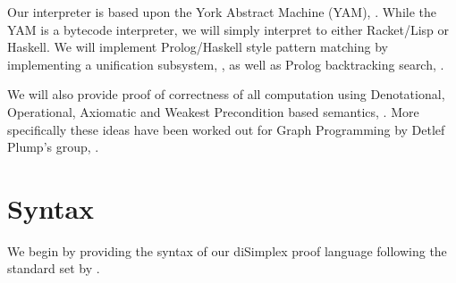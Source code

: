 Our interpreter is based upon the York Abstract Machine (YAM),
\cite{manningPlump2008yorkMachine}. While the YAM is a bytecode interpreter, we
will simply interpret to either Racket/Lisp or Haskell. We will implement
Prolog/Haskell style pattern matching by implementing a unification subsystem,
\cite[section
30.5.1]{krishnamurthi2007programmingLanguagesApplicationInterpretation}, as well
as Prolog backtracking search,
\cite[34.1.1]{krishnamurthi2007programmingLanguagesApplicationInterpretation}.

We will also provide proof of correctness of all computation using Denotational,
Operational, Axiomatic and Weakest Precondition based semantics,
\cite{gunter1992semainticProgrammingLanguages,
winskel1993formalSemanticsProgrammingLanguages, gries1981scienceProgramming,
scott1970theoryComputation, plotkin1981structuralOperationalSemantics,
hoare1969axiomaticSemantics, dijkstra1975guardedCommandsFormalDerivation}. More
specifically these ideas have been worked out for Graph Programming by Detlef
Plump's group, \cite{steinert2007graphProgramming,
plumpSteinert2010semanticsGraphProgramming, poskittPlump2010hoareLogic,
poskittPlump2010hoareCalculus}.

\section{Syntax}

We begin by providing the syntax of our diSimplex proof language following the
standard set by \cite{friedmanWand2008essentialsProgrammingLanguages}.

\newcommand{\MExp}[1]{& \textnormal{MExp:} & #1  \nonumber \\}
\newcommand{\denExp}[2]{\ensuremath{ \lbrack \! \lbrack #1 \rbrack \! \rbrack #2}}
\newcommand{\denEql}[3]{\ensuremath{ \lbrack \! \lbrack #1 \rbrack \! \rbrack #2 = #3}}
\newcommand{\Denotation}[1]{& \textnormal{Den:} & #1 \\}
\newcommand{\opExp}[3]{\ensuremath{\langle #1 , #2 \rangle \rightarrow #3}}
\newcommand{\Operational}[1]{& \textnormal{Oper:} & %
 \begin{minipage}{6cm} \begin{prooftree} #1 \end{prooftree} \end{minipage} \nonumber \\}
\newcommand{\Axiomatic}[1]{& \textnormal{Axiom:} & %
 \begin{minipage}{6cm} \begin{prooftree} #1 \end{prooftree} \end{minipage} \nonumber }

